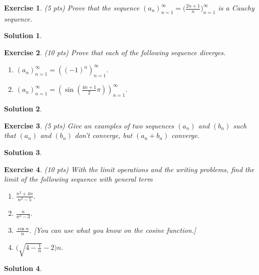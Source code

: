 \documentclass[12pt]{article}
\theoremstyle{plain}
\newtheorem{exer}{\textbf{Exercise}}}
\theoremstyle{plain}
\newtheorem*{sol}{\textbf{Solution}}}
\begin{document}
\begin{exer}
(5 pts)
Prove that the sequence $(a_n)_{n = 1}^\infty = \Big( \frac{2n + 1}{n} \Big)_{n = 1}^\infty$ is a Cauchy sequence.
\end{exer}
\begin{sol}

\end{sol}

\begin{exer}
(10 pts)
Prove that each of the following sequence diverges.
	\begin{enumerate}[label=\textbf{\alph*)}]
	\item $(a_n)_{n = 1}^\infty = ( (-1)^n )_{n = 1}^\infty$.
	\item $(a_n)_{n = 1}^\infty = ( \sin (\frac{4n + 1}{2} \pi) )_{n = 1}^{\infty}$.
	\end{enumerate}
\end{exer}
\begin{sol}

\end{sol}

\begin{exer}
(5 pts)
Give an examples of two sequences $(a_n)$ and $(b_n)$ such that $(a_n)$ and $(b_n)$ don't converge, but $(a_n + b_n)$ converge.
\end{exer}
\begin{sol}

\end{sol}

\begin{exer}
(10 pts)
With the limit operations and the writing problems, find the limit of the following sequence with general term
	\begin{enumerate}[label=\textbf{\alph*)}]
	\item $\frac{n^2 + 4n}{n^2 - 5}$.
	\item $\frac{n}{n^2 - 3}$.
	\item $\frac{\cos n}{n}$. [You can use what you know on the cosine function.]
	\item $\Big( \sqrt{4 - \frac{1}{n}} - 2 \Big) n$.
	\end{enumerate}
\end{exer}
\begin{sol}

\end{sol}
\end{document}
